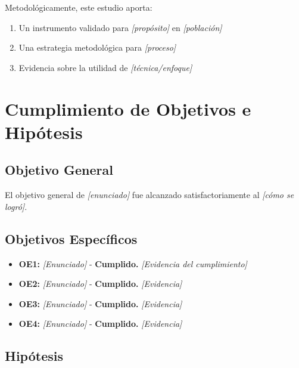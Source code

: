 Metodológicamente, este estudio aporta:

\begin{enumerate}
    \item Un instrumento validado para \textit{{[propósito]}} en \textit{{[población]}}
    \item Una estrategia metodológica para \textit{{[proceso]}}
    \item Evidencia sobre la utilidad de \textit{{[técnica/enfoque]}}
\end{enumerate}

\section{Cumplimiento de Objetivos e Hipótesis}
\label{sec:cumplimiento}

\subsection{Objetivo General}
\label{subsec:cumplimiento_og}

El objetivo general de \textit{{[enunciado]}} fue alcanzado satisfactoriamente al \textit{{[cómo se logró]}}.

\subsection{Objetivos Específicos}
\label{subsec:cumplimiento_oe}

\begin{itemize}
    \item \textbf{OE1:} \textit{{[Enunciado]}} - \textbf{Cumplido.} \textit{{[Evidencia del cumplimiento]}}
    \item \textbf{OE2:} \textit{{[Enunciado]}} - \textbf{Cumplido.} \textit{{[Evidencia]}}
    \item \textbf{OE3:} \textit{{[Enunciado]}} - \textbf{Cumplido.} \textit{{[Evidencia]}}
    \item \textbf{OE4:} \textit{{[Enunciado]}} - \textbf{Cumplido.} \textit{{[Evidencia]}}
\end{itemize}

\subsection{Hipótesis}
\label{subsec:cumplimiento_hipotesis}

